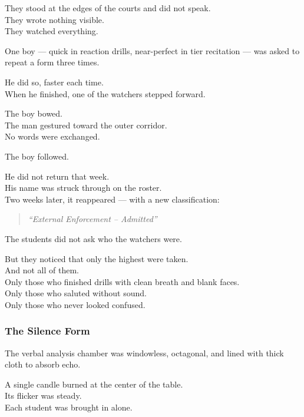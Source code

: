 \documentclass[12pt]{article}
\begin{document}
They stood at the edges of the courts and did not speak.\\
They wrote nothing visible.\\
They watched everything.

\vspace{1em}

One boy — quick in reaction drills, near-perfect in tier recitation — was asked to repeat a form three times.

He did so, faster each time.\\
When he finished, one of the watchers stepped forward.

The boy bowed.\\
The man gestured toward the outer corridor.\\
No words were exchanged.

The boy followed.

He did not return that week.\\
His name was struck through on the roster.\\
Two weeks later, it reappeared — with a new classification:

\begin{quote}
\textit{“External Enforcement – Admitted”}
\end{quote}

\vspace{1em}

The students did not ask who the watchers were.

But they noticed that only the highest were taken.\\
And not all of them.\\

Only those who finished drills with clean breath and blank faces.\\

Only those who saluted without sound.\\

Only those who never looked confused.

\dotfill

\subsubsection*{The Silence Form}

The verbal analysis chamber was windowless, octagonal, and lined with thick cloth to absorb echo.

A single candle burned at the center of the table.\\
Its flicker was steady.\\
Each student was brought in alone.
\end{document}
